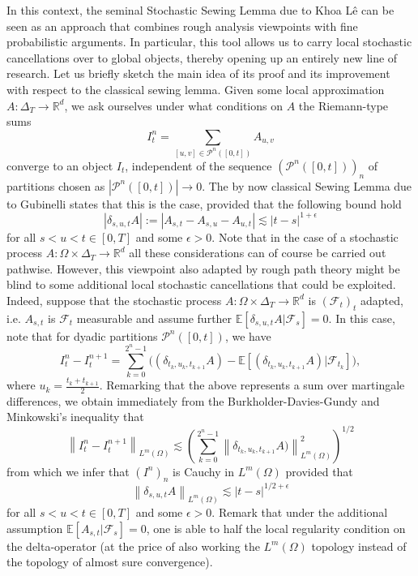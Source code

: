 \documentclass[11pt,oneside,english,reqno]{amsart}
\numberwithin{equation}{section}
\numberwithin{figure}{section}
\theoremstyle{plain}
\theoremstyle{definition}
\theoremstyle{remark}
\theoremstyle{plain}
\theoremstyle{plain}
\theoremstyle{plain}
\theoremstyle{plain}
\theoremstyle{plain}
\newcommand{\RR}{\mathbb{R}}
\newcommand{\norm}[1]{\left\lVert #1\right\rVert}
\begin{document}
\bigskip

In this context, the seminal Stochastic Sewing Lemma due to Khoa L\^e \cite{Le20} can be seen as an approach that combines rough analysis viewpoints with fine probabilistic arguments. In particular, this tool allows us to carry local stochastic cancellations over to global objects, thereby opening up an entirely new line of research. Let us briefly sketch the main idea of its proof and its improvement with respect to the classical sewing lemma. Given some local approximation $A:\Delta_T\to \RR^d$, we ask ourselves under what conditions on $A$ the Riemann-type sums
\[
I^n_t=\sum_{[u, v]\in \mathcal{P}^n([0,t])}A_{u,v}
\]
converge to an object $I_t$, independent of the sequence $(\mathcal{P}^n([0,t]))_n$ of partitions chosen as $|\mathcal{P}^n([0, t])|\to 0$. The by now classical Sewing Lemma due to Gubinelli \cite{gubi} states that this is the case, provided that the following bound hold
\[
|\delta_{s,u,t}A|:=|A_{s,t}-A_{s,u}-A_{u, t}|
\lesssim |t-s|^{1+\epsilon}
\]
for all $s<u<t\in [0, T]$ and some $\epsilon>0$. Note that in the case of a stochastic process $A:\Omega \times \Delta_T \to \RR^d$ all these considerations can of course be carried out pathwise. However, this viewpoint also adapted by rough path theory might be blind to some additional local stochastic cancellations that could be exploited. Indeed, suppose that the stochastic process $A:\Omega \times \Delta_T \to \RR^d$ is $(\mathcal{F}_t)_t$ adapted, i.e. $A_{s,t}$ is $\mathcal{F}_t$ measurable and assume further $\mathbb{E}[\delta_{s,u,t}A|\mathcal{F}_s]=0$. In this case, note that for dyadic partitions $\mathcal{P}^n([0,t])$, we have 
\[
I^n_t-I^{n+1}_t=\sum_{k=0}^{2^n-1} \Big((\delta_{t_k, u_k, t_{k+1}}A)-\mathbb{E}[(\delta_{t_k, u_k, t_{k+1}}A)|\mathcal{F}_{t_k}]\Big), 
\]
where $u_k=\frac{t_k+t_{k+1}}{2}$.
Remarking that the above represents a sum over martingale differences, we obtain immediately from the Burkholder-Davies-Gundy and Minkowski's inequality that 
\[
\norm{I^n_t-I^{n+1}_t}_{L^m(\Omega)}\lesssim \left(\sum_{k=0}^{2^n-1}\norm{\delta_{t_k, u_k, t_{k+1}}A)}_{L^m(\Omega)}^2\right)^{1/2}
\]
from which we infer that $(I^n)_n$ is Cauchy in $L^m(\Omega)$ provided that 
\[
\norm{\delta_{s,u,t}A}_{L^m(\Omega)}\lesssim |t-s|^{1/2+\epsilon}
\]
for all $s<u<t\in [0, T]$ and some $\epsilon>0$. Remark that under the additional assumption $\mathbb{E}[A_{s,t}|\mathcal{F}_s]=0$, one is able to half the local regularity condition on the delta-operator (at the price of also working the $L^m(\Omega)$ topology instead of the topology of almost sure convergence). 
\end{document}
